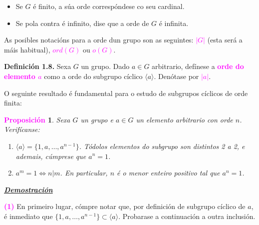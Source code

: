 \documentclass[twoside]{report}
\newcommand{\magbf}[1]{\textcolor{magenta}{\textbf{#1}}} %
\theoremstyle{mystyle}
\newtheorem{prop}{\magbf{Proposición}}[chapter]
\newenvironment{proposition}
{\begin{mdframed}[linecolor = magenta,backgroundcolor = classicrose, linewidth = 2mm]\begin{prop}}
{\end{prop}\end{mdframed}}
\begin{document}
\vspace{2mm}

\begin{itemize}
    \item Se $G$ é finito, a súa orde correspóndese co seu cardinal.
    \item Se pola contra é infinito, dise que a orde de $G$ é infinita.
\end{itemize}

\vspace{2mm}

\noindent As posibles notacións para a orde dun grupo son as seguintes: \textcolor{magenta}{$|G|$} (esta será a máis habitual), \textcolor{magenta}{$ord(G)$} ou \textcolor{magenta}{$o(G)$}.

\vspace{3mm}

\noindent \textbf{Definición 1.8.} Sexa $G$ un grupo. Dado $a \in G$ arbitrario, defínese a \textcolor{magenta}{\textbf{orde do elemento $a$}} como a orde do subgrupo cíclico $\langle a \rangle$. Denótase por \textcolor{magenta}{$|a|$}.

\vspace{3mm}

\noindent O seguinte resultado é fundamental para o estudo de subgrupos cíclicos de orde finita:

\vspace{3mm}

\begin{proposition} \label{prop1.3}
Sexa $G$ un grupo e $a \in G$ un elemento arbitrario con orde $n$. Verifícanse:
\begin{enumerate}
        \item $\langle a \rangle = \{ 1, a, \dots, a^{n-1} \}$. Tódolos elementos do subgrupo son distintos 2 a 2, e ademais, cúmprese que $a^{n} = 1$.
        \item $a^{m} = 1 \Longleftrightarrow n|m$. En particular, $n$ é o menor enteiro positivo tal que $a^{n} = 1$.
\end{enumerate}
\end{proposition}

\vspace{2mm}

\noindent \textbf{\textit{\underline{Demostración}}} 

\vspace{2mm}

\noindent \magbf{(1)} En primeiro lugar, cómpre notar que, por definición de subgrupo cíclico de $a$, é inmediato que $\{1,a,\dots,a^{n-1}\} \subset \langle a \rangle$. Probarase a continuación a outra inclusión. \\
\end{document}

